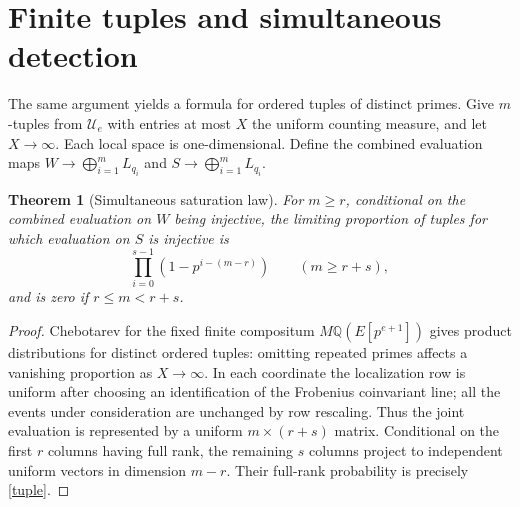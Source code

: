 \documentclass[11pt]{article}
\newtheorem{theorem}{Theorem}[section]
\theoremstyle{remark}\newtheorem{remark}[theorem]{Remark}
\newcommand{\Q}{\mathbb Q}\newcommand{\F}{\mathbb F}\newcommand{\Z}{\mathbb Z}
\begin{document}
\section{Finite tuples and simultaneous detection}
The same argument yields a formula for ordered tuples of distinct primes. Give $m$-tuples from $\mathcal U_e$ with entries at most $X$ the uniform counting measure, and let $X\to\infty$. Each local space is one-dimensional. Define the combined evaluation maps $W\to\bigoplus_{i=1}^mL_{q_i}$ and $S\to\bigoplus_{i=1}^m L_{q_i}$.

\begin{theorem}[Simultaneous saturation law]
For $m\geq r$, conditional on the combined evaluation on $W$ being injective, the limiting proportion of tuples for which evaluation on $S$ is injective is
\begin{equation}\label{tuple}
 \boxed{\prod_{i=0}^{s-1}(1-p^{i-(m-r)})}\qquad(m\geq r+s),
\end{equation}
and is zero if $r\leq m<r+s$.
\end{theorem}
\begin{proof}
Chebotarev for the fixed finite compositum $M\Q(E[p^{e+1}])$ gives product distributions for distinct ordered tuples: omitting repeated primes affects a vanishing proportion as $X\to\infty$. In each coordinate the localization row is uniform after choosing an identification of the Frobenius coinvariant line; all the events under consideration are unchanged by row rescaling. Thus the joint evaluation is represented by a uniform $m\times(r+s)$ matrix. Conditional on the first $r$ columns having full rank, the remaining $s$ columns project to independent uniform vectors in dimension $m-r$. Their full-rank probability is precisely \eqref{tuple}.
\end{proof}
\end{document}
